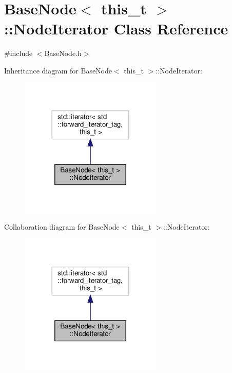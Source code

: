 \hypertarget{class_base_node_1_1_node_iterator}{}\section{Base\+Node$<$ this\+\_\+t $>$\+:\+:Node\+Iterator Class Reference}
\label{class_base_node_1_1_node_iterator}


{\ttfamily \#include $<$Base\+Node.\+h$>$}



Inheritance diagram for Base\+Node$<$ this\+\_\+t $>$\+:\+:Node\+Iterator\+:
\nopagebreak
\begin{figure}[H]
\begin{center}
\leavevmode
\includegraphics[width=192pt]{class_base_node_1_1_node_iterator__inherit__graph}
\end{center}
\end{figure}


Collaboration diagram for Base\+Node$<$ this\+\_\+t $>$\+:\+:Node\+Iterator\+:
\nopagebreak
\begin{figure}[H]
\begin{center}
\leavevmode
\includegraphics[width=192pt]{class_base_node_1_1_node_iterator__coll__graph}
\end{center}
\end{figure}
